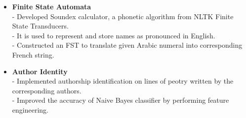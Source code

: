 \begin{itemize}
 \item \textbf{Finite State Automata} \\
 - Developed Soundex calculator, a phonetic algorithm  from NLTK Finite State Transducers.\\
 - It is used to represent and store names as pronounced in English.\\
 - Constructed an FST to translate given Arabic numeral into corresponding French string.

 \item \textbf{Author Identity} \\
 - Implemented authorship identification on lines of peotry written by the corresponding authors.\\
 - Improved the accuracy of Naive Bayes classifier by performing feature engineering.


\end{itemize}
